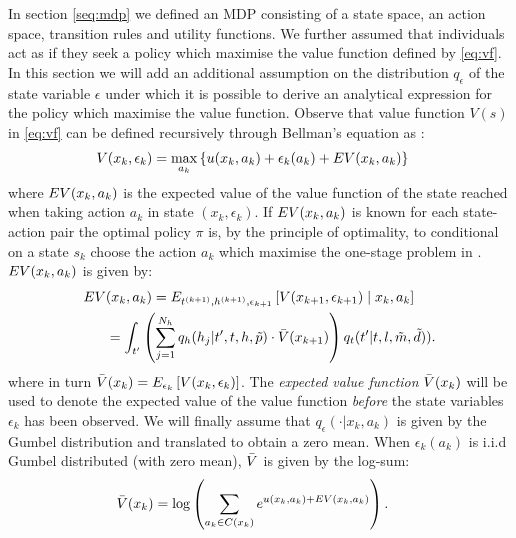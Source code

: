 In section \ref{seq:mdp} we defined an MDP consisting of a state space, an action space, transition rules and utility functions. We further assumed that individuals act as if they seek a policy which maximise the value function defined by \eqref{eq:vf}. In this section we will add an additional assumption on the distribution $q_\epsilon$ of the state variable $\epsilon$ under which it is possible to derive an analytical expression for the policy which maximise the value function. Observe that value function $V(s)$ in \eqref{eq:vf} can be defined recursively through Bellman's equation as \citep{bellman,Rust87}:
\begin{equation} \label{eq:vfbellman}
\begin{aligned}
V(x_k,\epsilon_k) &= \max_{a_k} \left\{\avgu(x_k,a_k) + \epsilon_k(a_k)+ \eutil(x_k,a_k) \right\} 
\end{aligned}
\end{equation}
where $EV(x_k,a_k) $ is the expected value of the value function of the state reached when taking action $a_k$ in state $(x_k,\epsilon_k)$. If $EV(x_k,a_k)$ is known for each state-action pair the optimal policy $\pi$ is, by the principle of optimality, to conditional on a state $s_k$ choose the action $a_k$ which maximise the one-stage problem in . $EV(x_k,a_k) $ is given by: 
\begin{equation} \label{eq:eutil}
\begin{aligned}
	\eutil&(x_k,a_k)  = E_{t\ks{k+1},\amem\ks{k+1},\epsilon_{k+1}}\left[ V(x_{k+1},\epsilon_{k+1}) \mid x_k,a_k \right] \\
	&= \int_{t'} \left( \sum_{j=1}^{N_{\amem}}q_\amem(\amem_j|t', t,\amem,\act{p}) \cdot \ev(x_{k+1}) \right)q_t(t'|t,l,\act{m},\act{d})).
	\end{aligned}
\end{equation}
where in turn $\bar{V}(x_k) = E_{\epsilon_k} \left[ V(x_k,\epsilon_k) \right]$.
The \emph{expected value function} $\bar{V}(x_k)$ will be used to denote the expected value of the value function \emph{before} the state variables $\epsilon_k$ has been observed.  We will finally assume that $q_\epsilon(\cdot|x_k,a_k)$ is given by the Gumbel distribution and translated to obtain a zero mean. When $\epsilon_k(a_k)$ is i.i.d Gumbel distributed (with zero mean), $\bar{V}$ is given by the log-sum:
\begin{equation} \label{eq:evfbellman}
\begin{aligned}
\ev(x_k) &= %
\log\left(\sum_{a_k\in C(x_{k})} e^{\avgu(x_k,a_k) + \eutil(x_k,a_k)}\right).
\end{aligned}
\end{equation}
